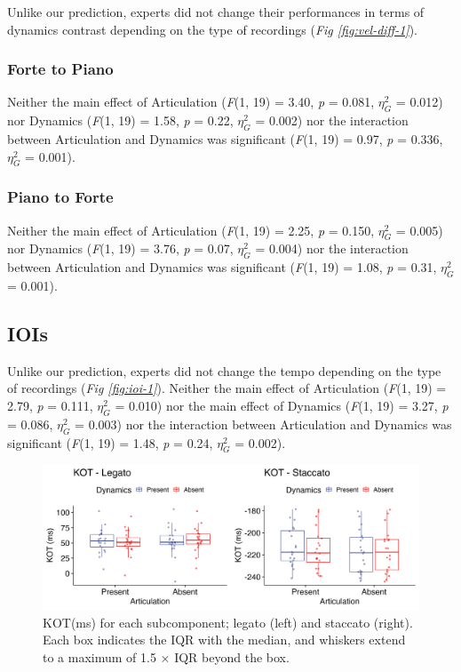 \documentclass[
  man,floatsintext]{apa6}
\begin{document}
Unlike our prediction, experts did not change their performances in terms of dynamics contrast depending on the type of recordings (\emph{Fig \ref{fig:vel-diff-1}}).

\hypertarget{forte-to-piano}{%
\subsubsection{Forte to Piano}\label{forte-to-piano}}

Neither the main effect of Articulation (\emph{F}(1, 19) = 3.40, \emph{p} = 0.081, \(\eta_G^2\) = 0.012) nor Dynamics (\emph{F}(1, 19) = 1.58, \emph{p} = 0.22, \(\eta_G^2\) = 0.002) nor the interaction between Articulation and Dynamics was significant (\emph{F}(1, 19) = 0.97, \emph{p} = 0.336, \(\eta_G^2\) = 0.001).

\hypertarget{piano-to-forte}{%
\subsubsection{Piano to Forte}\label{piano-to-forte}}

Neither the main effect of Articulation (\emph{F}(1, 19) = 2.25, \emph{p} = 0.150, \(\eta_G^2\) = 0.005) nor Dynamics (\emph{F}(1, 19) = 3.76, \emph{p} = 0.07, \(\eta_G^2\) = 0.004) nor the interaction between Articulation and Dynamics was significant (\emph{F}(1, 19) = 1.08, \emph{p} = 0.31, \(\eta_G^2\) = 0.001).

\hypertarget{iois}{%
\subsection{IOIs}\label{iois}}

Unlike our prediction, experts did not change the tempo depending on the type of recordings (\emph{Fig \ref{fig:ioi-1}}). Neither the main effect of Articulation (\emph{F}(1, 19) = 2.79, \emph{p} = 0.111, \(\eta_G^2\) = 0.010) nor the main effect of Dynamics (\emph{F}(1, 19) = 3.27, \emph{p} = 0.086, \(\eta_G^2\) = 0.003) nor the interaction between Articulation and Dynamics was significant (\emph{F}(1, 19) = 1.48, \emph{p} = 0.24, \(\eta_G^2\) = 0.002).

\begin{figure}
\includegraphics[width=1\linewidth]{manuscript_files/figure-latex/plot-kot-1-1} \caption{\label{fig:kot-1}KOT(ms) for each subcomponent; legato (left) and staccato (right). Each box indicates the IQR with the median, and whiskers extend to a maximum of 1.5 × IQR beyond the box.}\label{fig:plot-kot-1}
\end{figure}
\end{document}
